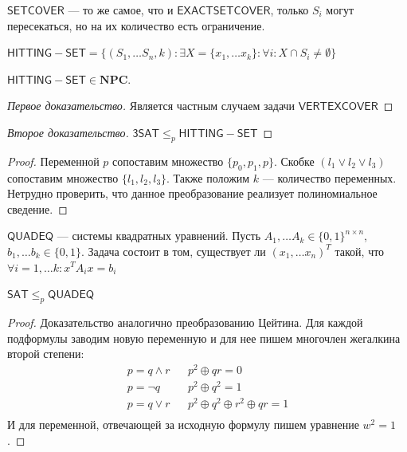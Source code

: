 \begin{definition}
    \(\mathsf{SETCOVER}\) --- то же самое, что и \(\mathsf{EXACTSETCOVER}\), только \(S_i\) могут пересекаться, но на их количество есть ограничение.
\end{definition}

\begin{definition}
    \(\mathsf{HITTING-SET} = \{(S_1, \dots S_n, k): \exists X = \{x_1, \dots x_k\}: \forall i: X \cap S_i \ne \emptyset\}\)
\end{definition}

\begin{proposition}
    \(\mathsf{HITTING-SET} \in \mathbf{NPC}\).
\end{proposition}
\begin{proof}[Первое доказательство]
    Является частным случаем задачи \(\mathsf{VERTEXCOVER}\)
\end{proof}

\begin{proof}[Второе доказательство]
    \(\mathsf{3SAT} \le_p \mathsf{HITTING-SET}\)
\end{proof}
\begin{proof}
    Переменной \(p\) сопоставим множество \(\{p_0, p_1, p\}\). Скобке \((l_1 \vee l_2 \vee l_3)\) сопоставим множество \(\{l_1, l_2, l_3\}\). Также положим \(k\) --- количество переменных. Нетрудно проверить, что данное преобразование реализует полиномиальное сведение.
\end{proof}

\begin{definition}
    \(\mathsf{QUADEQ}\) --- системы квадратных уравнений. Пусть \(A_1, \dots A_k \in \{0, 1\}^{n \times n}\), \(b_1, \dots b_k \in \{0, 1\}\). Задача состоит в том, существует ли \((x_1, \dots x_n)^T\) такой, что \(\forall i = 1, \dots k: x^TA_ix = b_i\)
\end{definition}

\begin{proposition}
    \(\mathsf{SAT} \le_p \mathsf{QUADEQ}\)
\end{proposition}
\begin{proof}
    Доказательство аналогично преобразованию Цейтина. Для каждой подформулы заводим новую переменную и для нее пишем многочлен жегалкина второй степени:
    \[\begin{array}{ccc}
        p = q \wedge r & & p^2 \oplus qr = 0\\
        p = \neg q & & p^2 \oplus q^2 = 1\\
        p = q \vee r & & p^2 \oplus q^2 \oplus r^2 \oplus qr = 1\\
    \end{array}\]
    И для переменной, отвечающей за исходную формулу пишем уравнение \(w^2 = 1\).
\end{proof}

